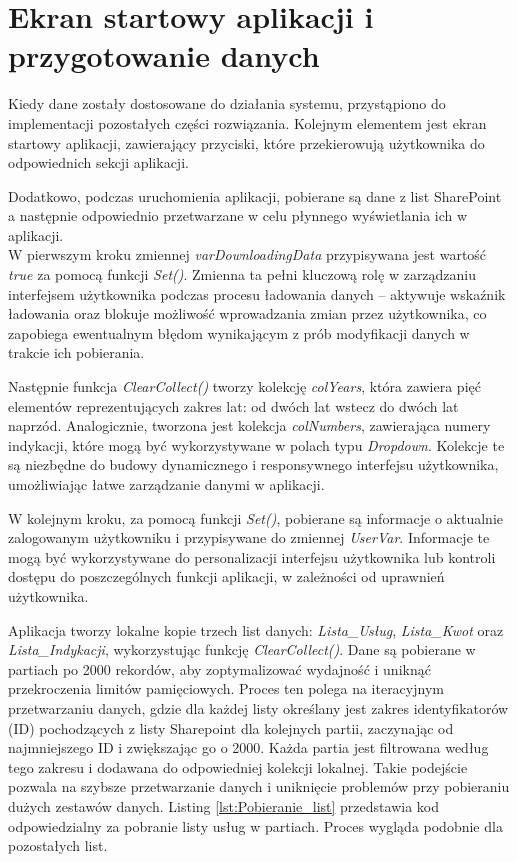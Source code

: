 \section{Ekran startowy aplikacji i przygotowanie danych}
\label{relacje-list}

Kiedy dane zostały dostosowane do działania systemu, przystąpiono do implementacji pozostałych części rozwiązania.
Kolejnym elementem jest ekran startowy aplikacji, zawierający przyciski, które przekierowują użytkownika do odpowiednich sekcji aplikacji.

Dodatkowo, podczas uruchomienia aplikacji, pobierane są dane z list SharePoint a następnie odpowiednio przetwarzane w celu płynnego wyświetlania ich w aplikacji. \\

W pierwszym kroku zmiennej \emph{varDownloadingData} przypisywana jest wartość \emph{true} za pomocą funkcji \emph{Set()}. Zmienna ta pełni kluczową rolę w zarządzaniu interfejsem użytkownika podczas procesu ładowania danych – aktywuje wskaźnik ładowania oraz blokuje możliwość wprowadzania zmian przez użytkownika, co zapobiega ewentualnym błędom wynikającym z prób modyfikacji danych w trakcie ich pobierania.

Następnie funkcja \emph{ClearCollect()} tworzy kolekcję \emph{colYears}, która zawiera pięć elementów reprezentujących zakres lat: od dwóch lat wstecz do dwóch lat naprzód. Analogicznie, tworzona jest kolekcja \emph{colNumbers}, zawierająca numery indykacji, które mogą być wykorzystywane w polach typu \emph{Dropdown}. Kolekcje te są niezbędne do budowy dynamicznego i responsywnego interfejsu użytkownika, umożliwiając łatwe zarządzanie danymi w aplikacji.

W kolejnym kroku, za pomocą funkcji \emph{Set()}, pobierane są informacje o aktualnie zalogowanym użytkowniku i przypisywane do zmiennej \emph{UserVar}. Informacje te mogą być wykorzystywane do personalizacji interfejsu użytkownika lub kontroli dostępu do poszczególnych funkcji aplikacji, w zależności od uprawnień użytkownika.

Aplikacja tworzy lokalne kopie trzech list danych: \emph{Lista\_Usług}, \emph{Lista\_Kwot} oraz \emph{Lista\_Indykacji}, wykorzystując funkcję \emph{ClearCollect()}. Dane są pobierane w partiach po 2000 rekordów, aby zoptymalizować wydajność i uniknąć przekroczenia limitów pamięciowych. Proces ten polega na iteracyjnym przetwarzaniu danych, gdzie dla każdej listy określany jest zakres identyfikatorów (ID) pochodzących z listy Sharepoint dla kolejnych partii, zaczynając od najmniejszego ID i zwiększając go o 2000. Każda partia jest filtrowana według tego zakresu i dodawana do odpowiedniej kolekcji lokalnej. Takie podejście pozwala na szybsze przetwarzanie danych i uniknięcie problemów przy pobieraniu dużych zestawów danych. Listing \ref{lst:Pobieranie_list} przedstawia kod odpowiedzialny za pobranie listy usług w partiach. Proces wygląda podobnie dla pozostałych list.


